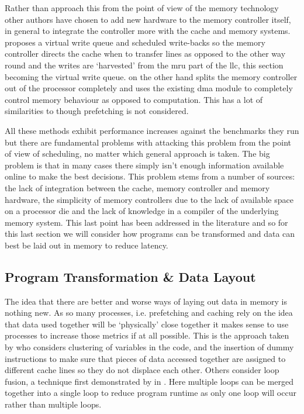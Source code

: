 Rather than approach this from the point of view of the memory technology other authors have chosen to add new hardware to the memory controller itself, in general to integrate the controller more with the cache and memory systems. \citet{stuecheliCoordinatingDRAMLastLevelCache2011} proposes a virtual write queue and scheduled write-backs so the memory controller directs the cache when to transfer lines as opposed to the other way round and the writes are `harvested' from the \gls{mru} part of the \gls{llc}, this section becoming the virtual write queue. \citet{waslyHidingMemoryLatency2014} on the other hand splits the memory controller out of the processor completely and uses the existing \gls{dma} module to completely control memory behaviour as opposed to computation. This has a lot of similarities to \citet{veidenbaumDecoupledAccessDRAM1997} though prefetching is not considered.

All these methods exhibit performance increases against the benchmarks they run but there are fundamental problems with attacking this problem from the point of view of scheduling, no matter which general approach is taken. The big problem is that in many cases there simply isn't enough information available online to make the best decisions. This problem stems from a number of sources: the lack of integration between the cache, memory controller and memory hardware, the simplicity of memory controllers due to the lack of available space on a processor die and the lack of knowledge in a compiler of the underlying memory system. This last point has been addressed in the literature and so for this last section we will consider how programs can be transformed and data can best be laid out in memory to reduce latency. 

\subsection{Program Transformation \& Data Layout}

The idea that there are better and worse ways of laying out data in memory is nothing new. As so many processes, i.e. prefetching and caching rely on the idea that data used together will be `physically' close together it makes sense to use processes to increase those metrics if at all possible. This is the approach taken by \citet{pandaMemoryDataOrganization1997} who considers clustering of variables in the code, and the insertion of dummy instructions to make sure that pieces of data accessed together are assigned to different cache lines so they do not displace each other. Others consider loop fusion, a technique first demonstrated by \citet{gaoCollectiveLoopFusion1993} in \citeyear{gaoCollectiveLoopFusion1993}. Here multiple loops can be merged together into a single loop to reduce program runtime as only one loop will occur rather than multiple loops. 


